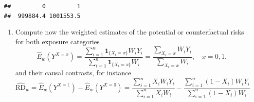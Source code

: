 \documentclass[
]{book}
\newenvironment{Shaded}{\begin{snugshade}}{\end{snugshade}}
\newcommand{\DecValTok}[1]{\textcolor[rgb]{0.00,0.00,0.81}{#1}}
\newcommand{\FunctionTok}[1]{\textcolor[rgb]{0.13,0.29,0.53}{\textbf{#1}}}
\newcommand{\NormalTok}[1]{#1}
\newcommand{\OtherTok}[1]{\textcolor[rgb]{0.56,0.35,0.01}{#1}}
\newcommand{\SpecialCharTok}[1]{\textcolor[rgb]{0.81,0.36,0.00}{\textbf{#1}}}
\providecommand{\tightlist}{%
  \setlength{\itemsep}{0pt}\setlength{\parskip}{0pt}}
\theoremstyle{definition}
\theoremstyle{definition}
\theoremstyle{definition}
\theoremstyle{definition}
\theoremstyle{remark}
\begin{document}
\begin{Shaded}
\end{Shaded}

\begin{verbatim}
##         0         1 
##  999884.4 1001553.5
\end{verbatim}

\begin{enumerate}
\def\labelenumi{\arabic{enumi}.}
\setcounter{enumi}{3}
\tightlist
\item
  Compute now the weighted estimates of the potential or
  counterfactual risks for both exposure categories
  \[ \widehat{E}_w(Y^{X = x}) =
  \frac{ \sum_{i=1}^n {\mathbf 1}_{ \{X_i=x\} } W_i Y_i }
     {\sum_{i=1}^n {\mathbf 1}_{ \{X_i=x\} }W_i} =
   \frac{ \sum_{X_i = x} W_i Y_i }{\sum_{X_i=x} W_i}, \quad x = 0,1, \]
  and their causal contrasts, for instance
  \[ \widehat{\text{RD}}_{w} = \widehat{E}_w(Y^{X = 1}) -
                \widehat{E}_w(Y^{X = 0})
    =  \frac{ \sum_{i=1}^n X_i W_i Y_i }{\sum_{i=1}^n X_i W_i} -
    \frac{ \sum_{i=1}^n (1-X_i) W_i Y_i }{\sum_{i=1}^n (1-X_i) W_i}\]
\end{enumerate}

\begin{Shaded}
\end{Shaded}
\end{document}
